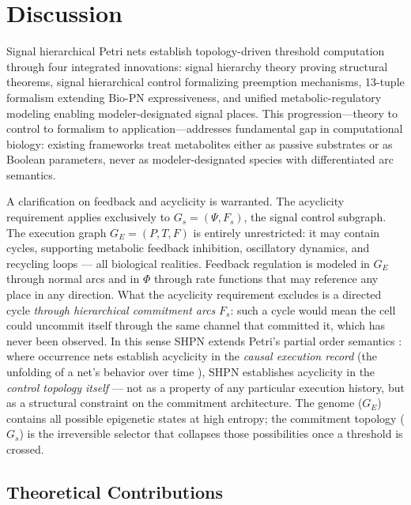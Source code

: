 \documentclass[10pt,letterpaper]{article}
\begin{document}
\section{Discussion}
\label{sec:discussion}

Signal hierarchical Petri nets establish topology-driven threshold computation
through four integrated innovations: signal hierarchy theory proving structural
theorems, signal hierarchical control formalizing preemption mechanisms,
13-tuple formalism extending Bio-PN expressiveness, and unified
metabolic-regulatory modeling enabling modeler-designated signal places.
This progression---theory to control to formalism to application---addresses
fundamental gap in computational biology: existing frameworks treat metabolites
either as passive substrates or as Boolean parameters, never as
modeler-designated species with differentiated arc semantics.

A clarification on feedback and acyclicity is warranted. The acyclicity
requirement applies exclusively to $G_s = (\Psi, F_s)$, the signal control
subgraph. The execution graph $G_E = (P, T, F)$ is entirely unrestricted: it
may contain cycles, supporting metabolic feedback inhibition, oscillatory
dynamics, and recycling loops --- all biological realities. Feedback regulation
is modeled in $G_E$ through normal arcs and in $\Phi$ through rate functions
that may reference any place in any direction. What the acyclicity requirement
excludes is a directed cycle \textit{through hierarchical commitment arcs}
$F_s$: such a cycle would mean the cell could uncommit itself through the
same channel that committed it, which has never been observed. In this sense
SHPN extends Petri's partial order semantics \cite{nielsen1981}: where
occurrence nets establish acyclicity in the \textit{causal execution record}
(the unfolding of a net's behavior over time \cite{winskel1987}), SHPN
establishes acyclicity in the \textit{control topology itself} --- not as a
property of any particular execution history, but as a structural constraint
on the commitment architecture. The genome ($G_E$) contains all possible
epigenetic states at high entropy; the commitment topology ($G_s$) is the
irreversible selector that collapses those possibilities once a threshold is
crossed.

\subsection{Theoretical Contributions}
\end{document}
